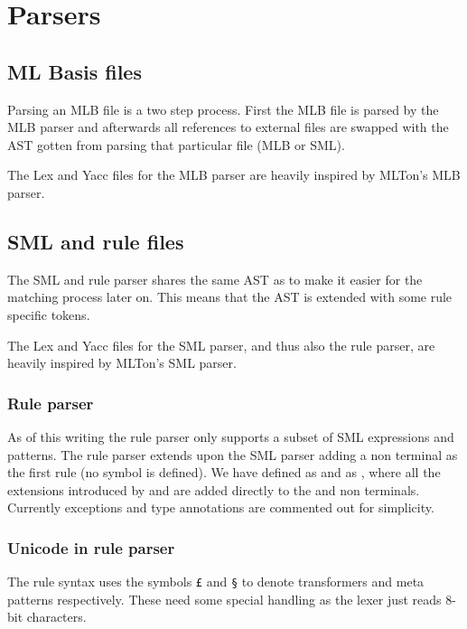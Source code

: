 
\section{Parsers}

\subsection{ML Basis files}

Parsing an MLB file is a two step process. First the MLB file is parsed by the
MLB parser and afterwards all references to external files are swapped with the
AST gotten from parsing that particular file (MLB or SML).

The Lex and Yacc files for the MLB parser are heavily inspired by MLTon's MLB
parser.

\subsection{SML and rule files}

The SML and rule parser shares the same AST as to make it easier for the
matching process later on. This means that the AST is extended with some rule
specific tokens.

The Lex and Yacc files for the SML parser, and thus also the rule parser, are
heavily inspired by MLTon's SML parser.

\subsubsection{Rule parser}

As of this writing the rule parser only supports a subset of SML expressions and
patterns. The rule parser extends upon the SML parser adding a 
non terminal as the first rule (no  symbol is defined). We have
defined  as  and  as , where all the
extensions introduced by  and  are added directly to the
 and  non terminals. Currently exceptions and type annotations
are commented out for simplicity.

\subsubsection{Unicode in rule parser}

The rule syntax uses the symbols \texttt{£} and \texttt{§} to denote
transformers and meta patterns respectively. These need some special handling as
the lexer\cite{ml-lex-yacc} just reads 8-bit characters.

